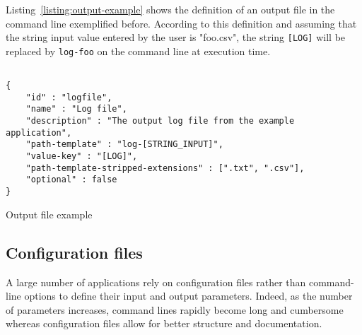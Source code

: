 \documentclass{article}
\begin{document}
Listing~\ref{listing:output-example} shows the definition of an output
file in the command line exemplified before. According to this
definition and assuming that the string input value entered by the
user is "foo.csv", the string \texttt{[LOG]} will be
replaced by \texttt{log-foo} on the command line at execution time.

\begin{listing}
\begin{verbatim}

{
    "id" : "logfile",
    "name" : "Log file",
    "description" : "The output log file from the example application",
    "path-template" : "log-[STRING_INPUT]",
    "value-key" : "[LOG]",
    "path-template-stripped-extensions" : [".txt", ".csv"],
    "optional" : false
}
\end{verbatim}
\caption{Output file example} 
\label{listing:output-example}
\end{listing}

\subsection{Configuration files}
\label{sec:configuration-files}
A large number of applications rely on configuration files rather than
command-line options to define their input and output
parameters. Indeed, as the number of parameters increases, command
lines rapidly become long and cumbersome whereas configuration files
allow for better structure and documentation.
\end{document}
